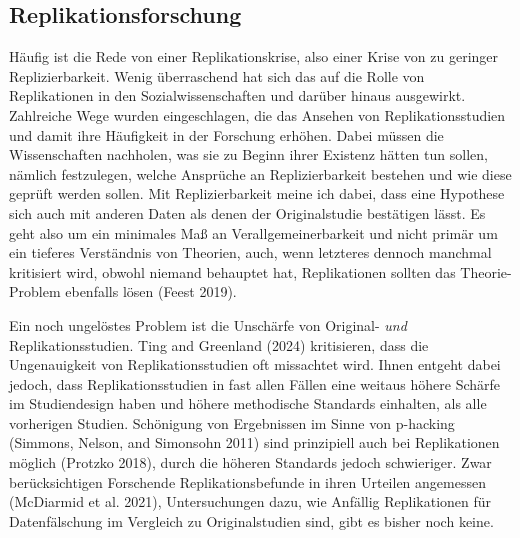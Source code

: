 \documentclass[
  letterpaper,
  DIV=11,
  numbers=noendperiod]{scrreprt}
\begin{document}
\subsection{Replikationsforschung}\label{replikationsforschung}

Häufig ist die Rede von einer Replikationskrise, also einer Krise von zu
geringer Replizierbarkeit. Wenig überraschend hat sich das auf die Rolle
von Replikationen in den Sozialwissenschaften und darüber hinaus
ausgewirkt. Zahlreiche Wege wurden eingeschlagen, die das Ansehen von
Replikationsstudien und damit ihre Häufigkeit in der Forschung erhöhen.
Dabei müssen die Wissenschaften nachholen, was sie zu Beginn ihrer
Existenz hätten tun sollen, nämlich festzulegen, welche Ansprüche an
Replizierbarkeit bestehen und wie diese geprüft werden sollen. Mit
Replizierbarkeit meine ich dabei, dass eine Hypothese sich auch mit
anderen Daten als denen der Originalstudie bestätigen lässt. Es geht
also um ein minimales Maß an Verallgemeinerbarkeit und nicht primär um
ein tieferes Verständnis von Theorien, auch, wenn letzteres dennoch
manchmal kritisiert wird, obwohl niemand behauptet hat, Replikationen
sollten das Theorie-Problem ebenfalls lösen (Feest 2019).

\begin{tcolorbox}[enhanced jigsaw, left=2mm, colback=white, colframe=quarto-callout-note-color-frame, opacitybacktitle=0.6, opacityback=0, title=\textcolor{quarto-callout-note-color}{\faInfo}\hspace{0.5em}{Unschärfe von Replikationsstudien}, toptitle=1mm, coltitle=black, colbacktitle=quarto-callout-note-color!10!white, titlerule=0mm, bottomtitle=1mm, leftrule=.75mm, breakable, rightrule=.15mm, bottomrule=.15mm, toprule=.15mm, arc=.35mm]

Ein noch ungelöstes Problem ist die Unschärfe von Original- \emph{und}
Replikationsstudien. Ting and Greenland (2024) kritisieren, dass die
Ungenauigkeit von Replikationsstudien oft missachtet wird. Ihnen entgeht
dabei jedoch, dass Replikationsstudien in fast allen Fällen eine weitaus
höhere Schärfe im Studiendesign haben und höhere methodische Standards
einhalten, als alle vorherigen Studien. Schönigung von Ergebnissen im
Sinne von p-hacking (Simmons, Nelson, and Simonsohn 2011) sind
prinzipiell auch bei Replikationen möglich (Protzko 2018), durch die
höheren Standards jedoch schwieriger. Zwar berücksichtigen Forschende
Replikationsbefunde in ihren Urteilen angemessen (McDiarmid et al.
2021), Untersuchungen dazu, wie Anfällig Replikationen für
Datenfälschung im Vergleich zu Originalstudien sind, gibt es bisher noch
keine.

\end{tcolorbox}
\end{document}
